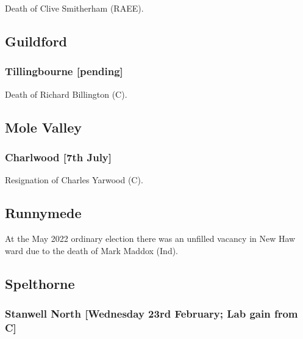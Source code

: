 \documentclass[a4paper,openany]{book}
\begin{document}
\begin{resultsiii}
Death of Clive Smitherham (RAEE).

\subsection*{Guildford}

\subsubsection*{Tillingbourne \hspace*{\fill}\nolinebreak[1]%
	\enspace\hspace*{\fill}
	[pending]}


Death of Richard Billington (C).

\subsection*{Mole Valley}

\subsubsection*{Charlwood \hspace*{\fill}\nolinebreak[1]%
	\enspace\hspace*{\fill}
	[7th July]}


Resignation of Charles Yarwood (C).

\subsection*{Runnymede}

At the May 2022 ordinary election there was an unfilled vacancy in New Haw ward due to the death of Mark Maddox (Ind).%

\subsection*{Spelthorne}

\subsubsection*{Stanwell North \hspace*{\fill}\nolinebreak[1]%
	\enspace\hspace*{\fill}
	[Wednesday 23rd February; Lab gain from C]}


\end{resultsiii}
\end{document}
